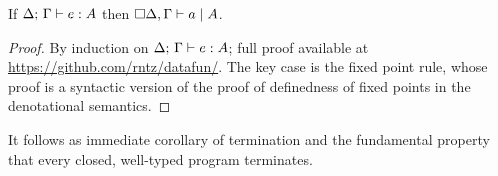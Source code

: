 \begin{theorem}
  If $\J{\GD}{\GG}{e}{A}$ then $\lrcx{\disc{\GD},\GG}{A}{a}$.
\end{theorem}
\begin{proof}
  By induction on $\J{\GD}{\GG}{e}{A}$; full proof available at
  \url{https://github.com/rntz/datafun/}. The key case is the fixed point rule,
  whose proof is a syntactic version of the proof of definedness of fixed points
  in the denotational semantics.
\end{proof}

It follows as immediate corollary of termination and the fundamental property that
every closed, well-typed program terminates. 

